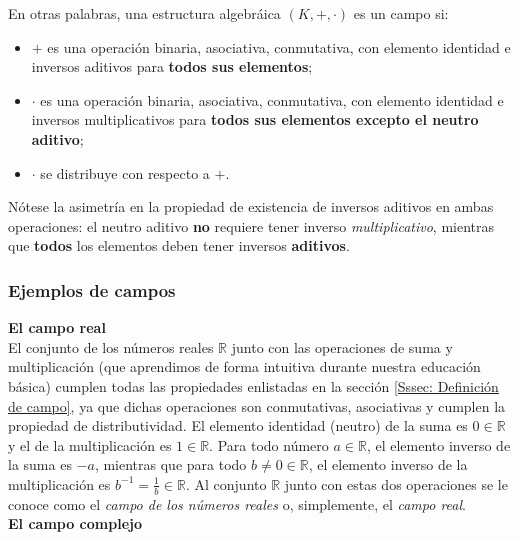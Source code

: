 \documentclass[apuntes]{subfiles}
\begin{document}
En otras palabras, una estructura algebráica $(K,+,\cdot)$ es un campo si:
\begin{itemize}
    \item $+$ es una operación binaria, asociativa, conmutativa, con elemento identidad e inversos aditivos para \textbf{todos sus elementos};

    \item $\cdot$ es una operación binaria, asociativa, conmutativa, con elemento identidad e inversos multiplicativos para \textbf{todos sus elementos excepto el neutro aditivo};

    \item $\cdot$ se distribuye con respecto a $+$.
\end{itemize}

Nótese la asimetría en la propiedad de existencia de inversos aditivos en ambas operaciones: el neutro aditivo \textbf{no} requiere tener inverso \emph{multiplicativo}, mientras que \textbf{todos} los elementos deben tener inversos \textbf{aditivos}.

\subsubsection{Ejemplos de campos} \label{Sssec: Ejemplos de campos}

\textbf{El campo real} \\

El conjunto de los números reales $\mathbb{R}$ junto con las operaciones de suma y multiplicación (que aprendimos de forma intuitiva durante nuestra educación básica) cumplen todas las propiedades enlistadas en la sección \ref{Sssec: Definición de campo}, ya que dichas operaciones son conmutativas, asociativas y cumplen la propiedad de distributividad. El elemento identidad (neutro) de la suma es $0\in\mathbb{R}$ y el de la multiplicación es $1\in\mathbb{R}$. Para todo número $a\in\mathbb{R}$, el elemento inverso de la suma es $-a$, mientras que para todo $b\neq0\in\mathbb{R}$, el elemento inverso de la multiplicación es $b^{-1} = \frac{1}{b}\in\mathbb{R}$. Al conjunto $\mathbb{R}$ junto con estas dos operaciones se le conoce como el \emph{campo de los números reales} o, simplemente, el \emph{campo real}. \\

\textbf{El campo complejo} \\
\end{document}
